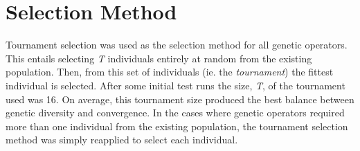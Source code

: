 \section{Selection Method}
Tournament selection \cite{miller1995genetic} was used as the selection method for all genetic operators. This entails selecting \emph{T} individuals entirely at random from the existing population. Then, from this set of individuals (ie. the \emph{tournament}) the fittest individual is selected. After some initial test runs the size, \emph{T}, of the tournament used was 16. On average, this tournament size produced the best balance between genetic diversity and convergence. In the cases where genetic operators required more than one individual from the existing population, the tournament selection method was simply reapplied to select each individual.